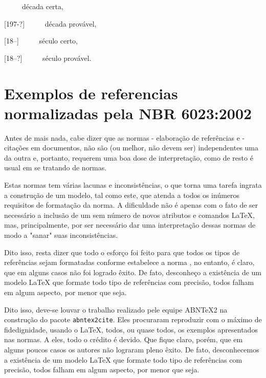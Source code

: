 \begin{apendicesenv}
[197-] \ \ \ \ \ década certa,

[197-?] \ \ \ \ \ década provável,

[18--] \ \ \ \ \ século certo,

[18--?] \ \ \ \ \ século provável.



\chapter{Exemplos de referencias normalizadas pela NBR 6023:2002}
\label{chap:apExemplosRefs}

Antes de mais nada, cabe dizer que as normas  - elaboração de referências e  - citações em documentos, não são (ou melhor, não devem ser) independentes uma da outra e, portanto, requerem uma boa dose de interpretação, como de resto é usual em se tratando de normas.

Estas normas tem várias lacunas e inconsistências, o que torna uma tarefa ingrata a construção de um modelo, tal como este, que atenda a todos os inúmeros requisitos de formatação da norma. A dificuldade não é apenas com o fato de ser necessário a inclusão de um sem número de novos atributos e comandos \LaTeX{}, mas, principalmente, por ser necessário dar uma interpretação dessas normas de modo a "sanar"{} suas inconsistências.

Dito isso, resta dizer que todo o esforço foi feito para que todos os tipos de referências sejam formatadas conforme estabelece a norma , no entanto, é claro, que em alguns casos não foi logrado êxito. De fato, desconheço a existência de um modelo \LaTeX{} que formate todo tipo de referências com precisão, todos falham em algum aspecto, por menor que seja.

Dito isso, deve-se louvar o trabalho realizado pele equipe  \textsc{ABN}\TeX\textsc{2} na construção do pacote \texttt{abntex2cite}. Eles procuraram reproduzir com o máximo de fidedignidade, usando o \LaTeX, todos, ou quase todos, os exemplos apresentados nas normas. A eles, todo o crédito é devido. Que fique claro, porém, que em alguns poucos casos os autores não lograram pleno êxito. De fato, desconhecemos a existência de um modelo \LaTeX{} que formate todo tipo de referências com precisão, todos falham em algum aspecto, por menor que seja.


\end{apendicesenv}
